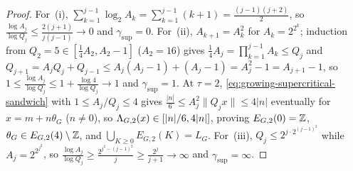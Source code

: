 \begin{proof}
For~(i), $\sum_{k=1}^{j-1}\log_2 A_k=\sum_{k=1}^{j-1}(k+1)=\frac{(j-1)(j+2)}{2}$,
so $\frac{\log A_j}{\log Q_j}\le\frac{2(j+1)}{j(j-1)}\to0$ and $\gamma_{\sup}=0$.
For~(ii), $A_{k+1}=A_k^2$ for $A_k=2^{2^k}$; induction from $Q_2=5\in[\frac14 A_2,A_2-1]$
($A_2=16$) gives $\frac14 A_j=\prod_{k=1}^{j-1}A_k\le Q_j$ and
$Q_{j+1}=A_jQ_j+Q_{j-1}\le A_j(A_j-1)+(A_j-1)=A_j^2-1=A_{j+1}-1$, so
$1\le\frac{\log A_j}{\log Q_j}\le 1+\frac{\log 4}{\log Q_j}\to1$ and $\gamma_{\sup}=1$.
At $\tau=2$, \eqref{eq:growing-supercritical-sandwich} with $1\le A_j/Q_j\le 4$
gives $\frac{|n|}{6}\le A_j^2\|Q_j x\|\le 4|n|$ eventually for $x=m+n\theta_G$ ($n\ne0$),
so $\Lambda_{G,2}(x)\in[|n|/6,4|n|]$, proving $E_{G,2}(0)=\mathbb{Z}$, $\theta_G\in E_{G,2}(4)\setminus\mathbb{Z}$,
and $\bigcup_{K\ge0}E_{G,2}(K)=L_G$. For~(iii), $Q_j\le 2^{j\cdot 2^{(j-1)^2}}$ while
$A_j=2^{2^{j^2}}$, so $\frac{\log A_j}{\log Q_j}\ge\frac{2^{j^2-(j-1)^2}}{j}\ge\frac{2^j}{j+1}\to\infty$
and $\gamma_{\sup}=\infty$.
\end{proof}

